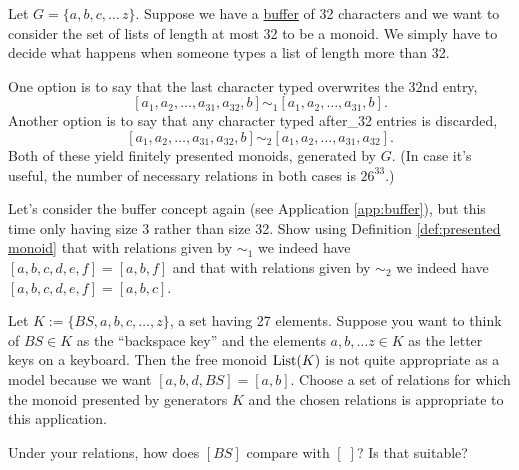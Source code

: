 \begin{exampleRUS}\label{ex:presented monoid}
\end{exampleRUS}

\begin{applicationENG}[Buffer]\label{app:buffer}
Let $G=\{a,b,c,\ldots\,z\}$. Suppose we have a \href{http://en.wikipedia.org/wiki/Data_buffer}{\text buffer} of 32 characters and we want to consider the set of lists of length at most 32 to be a monoid. We simply have to decide what happens when someone types a list of length more than 32. 

One option is to say that the last character typed overwrites the 32nd entry, $$[a_1,a_2,\ldots,a_{31},a_{32},b]\sim_1[a_1,a_2,\ldots,a_{31},b].$$ Another option is to say that any character typed after\_32 entries is discarded, $$[a_1,a_2,\ldots,a_{31},a_{32},b]\sim_2[a_1,a_2,\ldots,a_{31},a_{32}].$$ Both of these yield finitely presented monoids, generated by $G$. (In case it's useful, the number of necessary relations in both cases is $26^{33}$.)
\end{applicationENG}

\begin{applicationRUS}[Buffer]\label{app:buffer}
\end{applicationRUS}

\begin{exerciseENG}\label{exc:buffer3}
Let's consider the buffer concept again (see Application \ref{app:buffer}), but this time only having size 3 rather than size 32. Show using Definition \ref{def:presented monoid} that with relations given by $\sim_1$ we indeed have $[a,b,c,d,e,f]=[a,b,f]$ and that with relations given by $\sim_2$ we indeed have $[a,b,c,d,e,f]=[a,b,c]$.
\end{exerciseENG}

\begin{exerciseRUS}\label{exc:buffer3}
\end{exerciseRUS}

\begin{exerciseENG}
Let $K:=\{BS,a,b,c,\ldots,z\}$, a set having 27 elements. Suppose you want to think of $BS\in K$ as the “backspace key” and the elements $a,b,\ldots z\in K$ as the letter keys on a keyboard. Then the free monoid $\textnormal{List}(K)$ is not quite appropriate as a model because we want $[a,b,d,BS]=[a,b]$. 
\sexc Choose a set of relations for which the monoid presented by generators $K$ and the chosen relations is appropriate to this application. 
\item Under your relations, how does $[BS]$ compare with $[\;]$? Is that suitable?
\endsexc
\end{exerciseENG}

